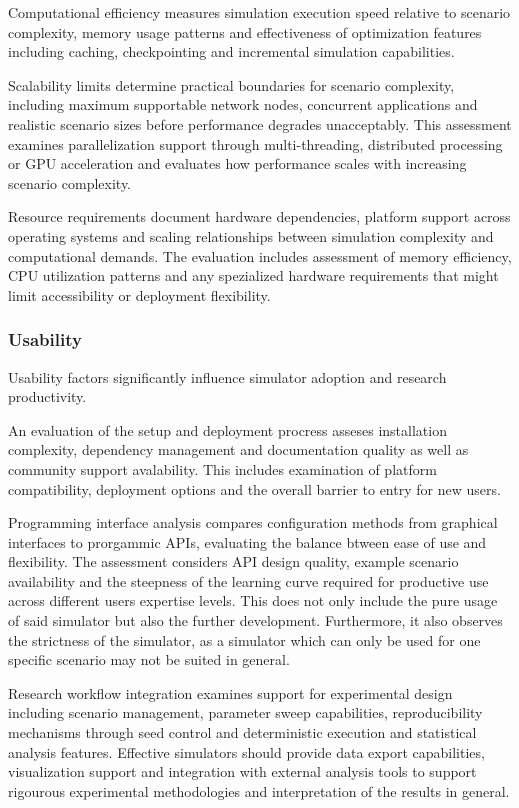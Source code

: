 Computational efficiency measures simulation execution speed relative to scenario complexity, memory usage patterns and effectiveness of optimization features including caching, checkpointing and incremental simulation capabilities.

Scalability limits determine practical boundaries for scenario complexity, including maximum supportable network nodes, concurrent applications and realistic scenario sizes before performance degrades unacceptably.
This assessment examines parallelization support through multi-threading, distributed processing or GPU acceleration and evaluates how performance scales with increasing scenario complexity.

Resource requirements document hardware dependencies, platform support across operating systems and scaling relationships between simulation complexity and computational demands.
The evaluation includes assessment of memory efficiency, CPU utilization patterns and any spezialized hardware requirements that might limit accessibility or deployment flexibility.

\subsubsection{Usability}
Usability factors significantly influence simulator adoption and research productivity.

An evaluation of the setup and deployment procress asseses installation complexity, dependency management and documentation quality as well as community support avalability.
This includes examination of platform compatibility, deployment options and the overall barrier to entry for new users.

Programming interface analysis compares configuration methods from graphical interfaces to prorgammic APIs, evaluating the balance btween ease of use and flexibility.
The assessment considers API design quality, example scenario availability and the steepness of the learning curve required for productive use across different users expertise levels.
This does not only include the pure usage of said simulator but also the further development.
Furthermore, it also observes the strictness of the simulator, as a simulator which can only be used for one specific scenario may not be suited in general.

Research workflow integration examines support for experimental design including scenario management, parameter sweep capabilities, reproducibility mechanisms through seed control and deterministic execution and statistical analysis features.
Effective simulators should provide data export capabilities, visualization support and integration with external analysis tools to support rigourous experimental methodologies and interpretation of the results in general.


